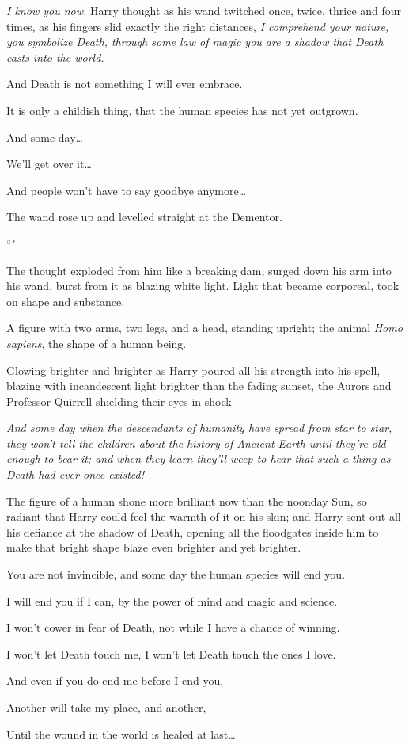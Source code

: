 \emph{I know you now,} Harry thought as his wand twitched once, twice, thrice and four times, as his fingers slid exactly the right distances, \emph{I comprehend your nature, you symbolize Death, through some law of magic you are a shadow that Death casts into the world.}

\begin{em}
And Death is not something I will ever embrace.

It is only a childish thing, that the human species has not yet outgrown.

And some day{\ldots}

We'll get over it{\ldots}

And people won't have to say goodbye anymore{\ldots}
\end{em}

The wand rose up and levelled straight at the Dementor.

``\emph{}"

The thought exploded from him like a breaking dam, surged down his arm into his wand, burst from it as blazing white light. Light that became corporeal, took on shape and substance.

A figure with two arms, two legs, and a head, standing upright; the animal \emph{Homo sapiens}, the shape of a human being.

Glowing brighter and brighter as Harry poured all his strength into his spell, blazing with incandescent light brighter than the fading sunset, the Aurors and Professor Quirrell shielding their eyes in shock\---

\emph{And some day when the descendants of humanity have spread from star to star, they won't tell the children about the history of Ancient Earth until they're old enough to bear it; and when they learn they'll weep to hear that such a thing as Death had ever once existed!}

The figure of a human shone more brilliant now than the noonday Sun, so radiant that Harry could feel the warmth of it on his skin; and Harry sent out all his defiance at the shadow of Death, opening all the floodgates inside him to make that bright shape blaze even brighter and yet brighter.

\begin{em}
You are not invincible, and some day the human species will end you.

I will end you if I can, by the power of mind and magic and science.

I won't cower in fear of Death, not while I have a chance of winning.

I won't let Death touch me, I won't let Death touch the ones I love.

And even if you do end me before I end you,

Another will take my place, and another,

Until the wound in the world is healed at last{\ldots}
\end{em}

